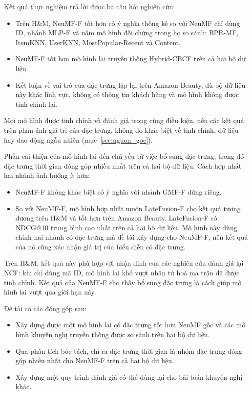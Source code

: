 Kết quả thực nghiệm trả lời được ba câu hỏi nghiên cứu:
\begin{itemize}
    \item Trên H\&M, NeuMF-F tốt hơn có ý nghĩa thống kê so với NeuMF chỉ dùng ID, nhánh MLP-F và năm mô hình đối chứng trong họ so sánh: BPR-MF, ItemKNN, UserKNN, MostPopular-Recent và Content.
    \item NeuMF-F tốt hơn mô hình lai truyền thống Hybrid-CBCF trên cả hai bộ dữ liệu.
    \item Kết luận về vai trò của đặc trưng lặp lại trên Amazon Beauty, dù bộ dữ liệu này khác lĩnh vực, không có thông tin khách hàng và mô hình không được tinh chỉnh lại.
\end{itemize}

Mọi mô hình được tinh chỉnh và đánh giá trong cùng điều kiện, nên các kết quả trên phản ánh giá trị của đặc trưng, không do khác biệt về tinh chỉnh, dữ liệu hay dao động ngẫu nhiên (mục~\ref{sec:nguon_goc}).

Phần cải thiện của mô hình lai đến chủ yếu từ việc bổ sung đặc trưng, trong đó đặc trưng thời gian đóng góp nhiều nhất trên cả hai bộ dữ liệu. Cách hợp nhất hai nhánh ảnh hưởng ít hơn:
\begin{itemize}
    \item NeuMF-F không khác biệt có ý nghĩa với nhánh GMF-F đứng riêng.
    \item So với NeuMF-F, mô hình hợp nhất muộn LateFusion-F cho kết quả tương đương trên H\&M và tốt hơn trên Amazon Beauty. LateFusion-F có NDCG@10 trung bình cao nhất trên cả hai bộ dữ liệu. Mô hình này dùng chính hai nhánh có đặc trưng mà đề tài xây dựng cho NeuMF-F, nên kết quả của nó cũng xác nhận giá trị của biểu diễn có đặc trưng.
\end{itemize}

Trên H\&M, kết quả này phù hợp với nhận định của các nghiên cứu đánh giá lại NCF: khi chỉ dùng mã ID, mô hình lai khó vượt nhân tử hoá ma trận đã được tinh chỉnh. Kết quả của NeuMF-F cho thấy bổ sung đặc trưng là cách giúp mô hình lai vượt qua giới hạn này.

Đề tài có các đóng góp sau:
\begin{itemize}
    \item Xây dựng được một mô hình lai có đặc trưng tốt hơn NeuMF gốc và các mô hình khuyến nghị truyền thống được so sánh trên hai bộ dữ liệu.
    \item Qua phân tích bóc tách, chỉ ra đặc trưng thời gian là nhóm đặc trưng đóng góp nhiều nhất cho NeuMF-F trên cả hai bộ dữ liệu.
    \item Xây dựng một quy trình đánh giá có thể dùng lại cho bài toán khuyến nghị khác.
\end{itemize}

